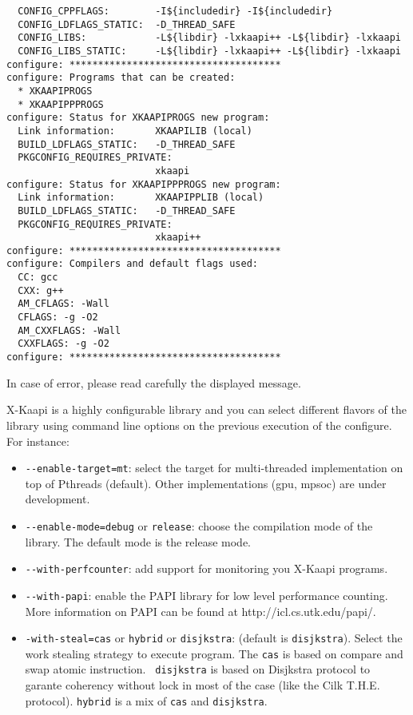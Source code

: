 \documentclass{article}
\newcommand{\kaapi}{\textsc{X}-Kaapi\xspace}
\begin{document}
\begin{verbatim}
  CONFIG_CPPFLAGS:        -I${includedir} -I${includedir}
  CONFIG_LDFLAGS_STATIC:  -D_THREAD_SAFE 
  CONFIG_LIBS:            -L${libdir} -lxkaapi++ -L${libdir} -lxkaapi
  CONFIG_LIBS_STATIC:     -L${libdir} -lxkaapi++ -L${libdir} -lxkaapi
configure: *************************************
configure: Programs that can be created: 
  * XKAAPIPROGS
  * XKAAPIPPPROGS
configure: Status for XKAAPIPROGS new program:
  Link information:       XKAAPILIB (local)
  BUILD_LDFLAGS_STATIC:   -D_THREAD_SAFE 
  PKGCONFIG_REQUIRES_PRIVATE:
                          xkaapi
configure: Status for XKAAPIPPPROGS new program:
  Link information:       XKAAPIPPLIB (local)
  BUILD_LDFLAGS_STATIC:   -D_THREAD_SAFE 
  PKGCONFIG_REQUIRES_PRIVATE:
                          xkaapi++
configure: *************************************
configure: Compilers and default flags used:
  CC: gcc
  CXX: g++
  AM_CFLAGS: -Wall
  CFLAGS: -g -O2
  AM_CXXFLAGS: -Wall
  CXXFLAGS: -g -O2
configure: *************************************
\end{verbatim}
\bigskip
In case of error, please read carefully the displayed message.

\bigskip
\kaapi is a highly configurable library and you can select different flavors of the library using command line options on the previous execution of the configure. For instance:
\begin{itemize}
\item \verb+--enable-target=mt+: select the target for multi-threaded implementation on top of Pthreads (default). Other implementations (gpu, mpsoc) are under development. 
\item \verb+--enable-mode=debug+ or \verb+release+: choose the compilation mode of the library. The default mode is the release mode.
\item \verb+--with-perfcounter+: add support for monitoring you \kaapi programs.	
\item \verb+--with-papi+: enable the PAPI library for low level performance counting. More information on PAPI can be found at http://icl.cs.utk.edu/papi/.
\item \verb+-with-steal=cas+ or \verb+hybrid+ or \verb+disjkstra+: (default is \verb+disjkstra+). Select the work stealing strategy to execute program. The \verb+cas+ is based on compare and swap atomic instruction. \verb+ disjkstra+ is based on Disjkstra protocol to garante coherency without lock in most of the case (like the Cilk T.H.E. protocol). \verb+hybrid+ is a  mix of \verb+cas+ and \verb+disjkstra+.
\end{itemize}
\end{document}
